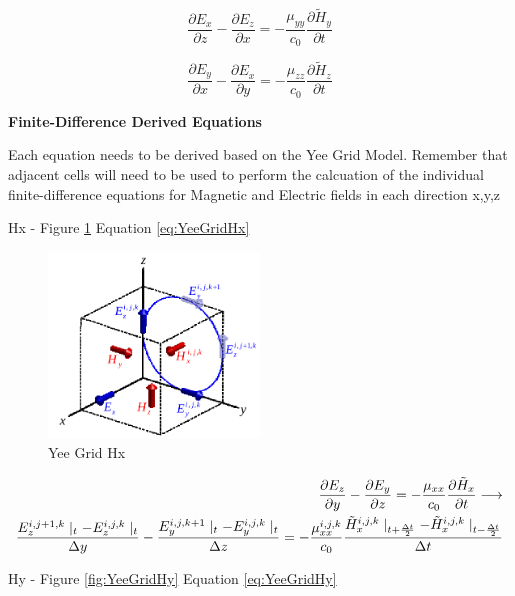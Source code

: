 \documentclass[a4paper,10pt]{article}
\begin{document}
\begin{equation}
  \frac{\partial E_x}{\partial z} - \frac{\partial E_z}{\partial x} = -\frac{\mu_{yy}}{c_0}\frac{\partial\tilde{H}_y}{\partial t}
\end{equation}

\begin{equation}
  \frac{\partial E_y}{\partial x} - \frac{\partial E_x}{\partial y} = -\frac{\mu_{zz}}{c_0}\frac{\partial\tilde{H}_z}{\partial t}
\end{equation}

\textbf{Finite-Difference Derived Equations}

Each equation needs to be derived based on the Yee Grid Model.  Remember that adjacent cells will need to be used to perform the calcuation of the individual finite-difference equations for Magnetic and Electric fields in each direction x,y,z

Hx - Figure \ref{fig:YeeGridHx} Equation \eqref{eq:YeeGridHx} 

\begin{figure}[h]
  \centering
    \includegraphics[width=0.5\textwidth]{YeeGridHx.png}
  \caption{Yee Grid Hx}
  \label{fig:YeeGridHx}
\end{figure}

\begin{align}
  \label{eq:YeeGridHx}
  \frac{\partial E_z}{\partial y} - \frac{\partial E_y}{\partial z} = -\frac{\mu_{xx}}{c_0}\frac{\partial\tilde{H}_x}{\partial t}
  \longrightarrow\\
  \frac{E_{z}^{i,j+1,k}\mid_{t} - E_{z}^{i,j,k}\mid_{t}}{\Delta y} - \frac{E_{y}^{i,j,k+1}\mid_{t} - E_{y}^{i,j,k}\mid_{t}}{\Delta z} = -\frac{\mu_{xx}^{i,j,k}}{c_0} \frac{\tilde{H}_{x}^{i,j,k}\mid_{t+\frac  {\Delta t}{2}} - \tilde{H}_{x}^{i,j,k}\mid_{t-\frac{\Delta t}{2}}}{\Delta t}\notag
\end{align}


Hy - Figure \ref{fig:YeeGridHy} Equation \eqref{eq:YeeGridHy} 
\end{document}
